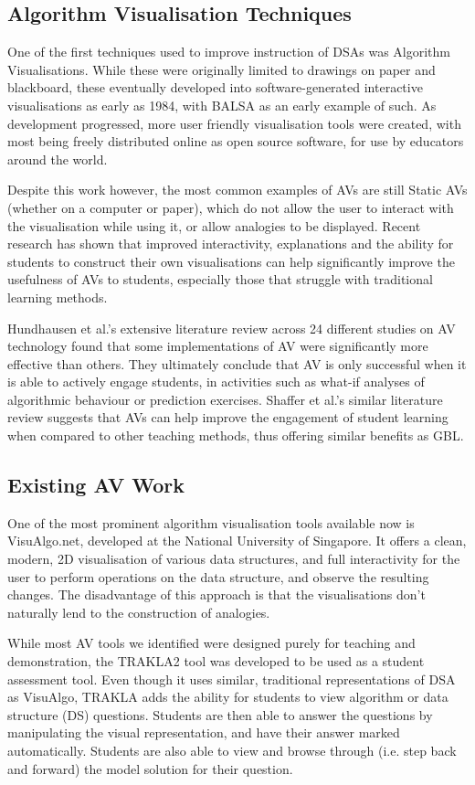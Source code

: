 \documentclass[10pt]{article}
\begin{document}
\subsection{Algorithm Visualisation Techniques}
One of the first techniques used to improve instruction of DSAs was Algorithm Visualisations. While these were originally limited to drawings on paper and blackboard, these eventually developed into software-generated interactive visualisations as early as 1984, with BALSA\cite{Brown:1984:SAA:964965.808596} as an early example of such. As development progressed, more user friendly visualisation tools were created, with most being freely distributed online as open source software, for use by educators around the world.\par
Despite this work however, the most common examples of AVs are still Static AVs (whether on a computer or paper), which do not allow the user to interact with the visualisation while using it, or allow analogies to be displayed. Recent research has shown that improved interactivity, explanations\cite{vegh2} and the ability for students to construct their own visualisations can help significantly improve the usefulness of AVs to students, especially those that struggle with traditional learning methods\cite{Stasko:1993:AAA:169059.169078}.\par
Hundhausen et al.'s extensive literature review across 24 different studies on AV technology found that some implementations of AV were significantly more effective than others\cite{metaStudy}. They ultimately conclude that AV is only successful when it is able to actively engage students, in activities such as what-if analyses of algorithmic behaviour or prediction exercises. Shaffer et al.'s similar literature review suggests that AVs can help improve the engagement of student learning when compared to other teaching methods, thus offering similar benefits as GBL\cite{Shaffer:2010:AVS:1821996.1821997}.
\subsection{Existing AV Work}
One of the most prominent algorithm visualisation tools available now is VisuAlgo.net\cite{visualgo}, developed at the National University of Singapore. It offers a clean, modern, 2D visualisation of various data structures, and full interactivity for the user to perform operations on the data structure, and observe the resulting changes. The disadvantage of this approach is that the visualisations don't naturally lend to the construction of analogies.\par
While most AV tools we identified were designed purely for teaching and demonstration, the TRAKLA2\cite{TRAKLA2} tool was developed to be used as a student assessment tool. Even though it uses similar, traditional representations of DSA as VisuAlgo, TRAKLA adds the ability for students to view algorithm or data structure (DS) questions. Students are then able to answer the questions by manipulating the visual representation, and have their answer marked automatically. Students are also able to view and browse through (i.e. step back and forward) the model solution for their question.
\end{document}
